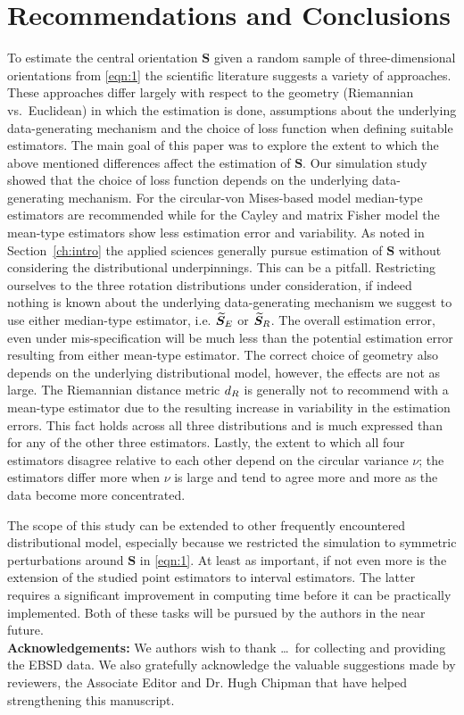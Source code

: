 \section{Recommendations and Conclusions}\label{sec:disc}

To estimate the central orientation $\bm S$ given a random sample of three-dimensional orientations from \eqref{eqn:1} the scientific literature suggests a variety of approaches. These approaches differ largely with respect to the geometry (Riemannian vs.~Euclidean) in which the estimation is done, assumptions about the underlying data-generating mechanism and the choice of loss function when defining suitable estimators. The main goal of this paper was to explore the extent to which the above mentioned differences affect the estimation of $\bm S$. 
Our simulation study showed that the choice of loss function depends on the underlying data-generating mechanism.  For the circular-von Mises-based model median-type estimators are recommended while for the Cayley and matrix Fisher model the mean-type estimators show less estimation error and variability. As noted in Section~\ref{ch:intro} the applied sciences generally pursue estimation of $\bm S$ without considering the distributional underpinnings. This can be a pitfall. Restricting ourselves to the three rotation distributions under consideration,  if indeed nothing is known about the underlying data-generating mechanism we suggest to use either median-type estimator, i.e. ${\widetilde{\bm S}_E}$ or ${\widetilde{\bm S}_R}$. The overall estimation error, even under mis-specification will be much less than the potential estimation error resulting from either mean-type estimator. The correct choice of geometry also depends on the underlying distributional model, however, the effects are not as large. The Riemannian distance metric  ${d_R}$ is generally not to recommend with a mean-type estimator due to the resulting increase in variability in the estimation errors. This fact holds across all three distributions  and is much expressed than for any of the other three estimators.
Lastly, the extent to which all four estimators disagree relative to each other depend on the circular variance $\nu$; the estimators differ more when $\nu$ is large and tend to agree more and more as the data become more concentrated.  
   
The scope of this study can be extended to other frequently encountered distributional model, especially because we restricted the simulation to symmetric perturbations around $\bm S$ in \eqref{eqn:1}. At least as important, if not even more is the extension of the studied point estimators to interval estimators. The latter requires a significant improvement in computing time before it can be practically implemented. Both of these tasks will be pursued by the authors in the near future.\\

\noindent \textbf{Acknowledgements:} We authors wish to thank \ldots \, for collecting and providing the EBSD data. We also gratefully acknowledge the valuable suggestions made by reviewers, the Associate Editor and Dr. Hugh Chipman that have helped strengthening this manuscript.

